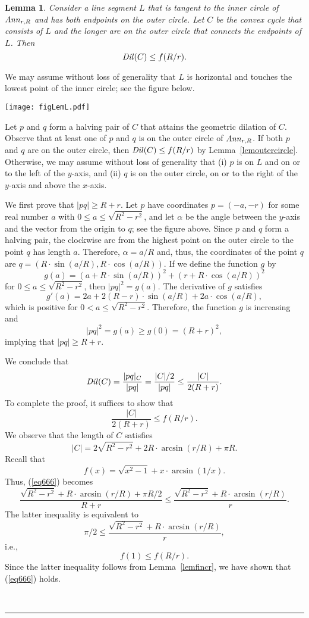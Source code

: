 \documentclass[12pt]{article}
\newtheorem{lemma}{Lemma}
\newcommand{\Ann}{\mathord{\it Ann}}
\newcommand{\Dil}{\mathord{\it Dil}}
\newcommand{\qed}{\rule{0.5em}{1.5ex}}
\newcommand{\fqed}{{\hfill~\qed}}
\newenvironment{proof}{{\noindent \bf Proof.}}
                      {{\hfill \fqed} \vspace{1em}}
\begin{document}
\begin{lemma}   \label{lemthree}  
Consider a line segment $L$ that is tangent to the inner circle of 
$\Ann_{r,R}$ and has both endpoints on the outer circle. Let $C$ be the 
convex cycle that consists of $L$ and the longer arc on the outer circle 
that connects the endpoints of $L$. Then 
\[ \Dil(C) \leq f(R/r) .
\]  
\end{lemma} 
\begin{proof} 
We may assume without loss of generality that $L$ is horizontal and 
touches the lowest point of the inner circle; see the figure below. 

\begin{center}
   \texttt{[image: figLemL.pdf]}
\end{center}

Let $p$ and $q$ form a halving pair of $C$ that attains the geometric 
dilation of $C$. Observe that at least one of $p$ and $q$ is on the 
outer circle of $\Ann_{r,R}$. If both $p$ and $q$ are on the outer 
circle, then $\Dil(C) \leq f(R/r)$ by Lemma~\ref{lemoutercircle}. 
Otherwise, we may assume without loss of generality that 
(i) $p$ is on $L$ and on or to the left of the $y$-axis, and 
(ii) $q$ is on the outer circle, on or to the right of the $y$-axis 
and above the $x$-axis. 

We first prove that $|pq| \geq R+r$. Let $p$ have coordinates $p=(-a,-r)$ 
for some real number $a$ with $0 \leq a \leq \sqrt{R^2-r^2}$, and 
let $\alpha$ be the angle between the $y$-axis and the vector from the 
origin to $q$; see the figure above. Since $p$ and $q$ form a halving 
pair, the clockwise arc from the highest point on the outer circle to 
the point $q$ has length $a$. Therefore, $\alpha = a/R$ and, thus, 
the coordinates of the point $q$ are 
$q = (R \cdot \sin(a/R),R \cdot \cos(a/R))$.   
If we define the function $g$ by 
\[ g(a) = (a+R \cdot \sin(a/R))^2 + (r+R \cdot \cos(a/R))^2  
\]
for $0 \leq a \leq \sqrt{R^2-r^2}$, then $|pq|^2 = g(a)$. 
The derivative of $g$ satisfies 
\[ g'(a) = 2a + 2(R-r) \cdot \sin(a/R) + 2a \cdot \cos(a/R) , 
\]
which is positive for $0 < a \leq \sqrt{R^2-r^2}$. Therefore, the 
function $g$ is increasing and 
\[ |pq|^2 = g(a) \geq g(0) = (R+r)^2 , 
\]
implying that $|pq| \geq R+r$. 

We conclude that 
\[ \Dil(C) = \frac{|pq|_C}{|pq|} = \frac{|C|/2}{|pq|} \leq 
           \frac{|C|}{2(R+r)} . 
\]  
To complete the proof, it suffices to show that 
\begin{equation}  \label{eq666} 
         \frac{|C|}{2(R+r)} \leq f(R/r) . 
\end{equation}  
We observe that the length of $C$ satisfies 
\[ |C| = 2 \sqrt{R^2-r^2} + 2R \cdot \arcsin (r/R) + \pi R . 
\] 
Recall that 
\[ f(x) = \sqrt{x^2-1} + x \cdot \arcsin(1/x) .   
\]
Thus, (\ref{eq666}) becomes 
\[ \frac{\sqrt{R^2-r^2} + R \cdot \arcsin (r/R) + \pi R/2}{R+r} 
    \leq 
   \frac{\sqrt{R^2-r^2} + R \cdot \arcsin (r/R)}{r} .  
\]
The latter inequality is equivalent to 
\[ \pi/2 \leq \frac{\sqrt{R^2-r^2} + R \cdot \arcsin (r/R)}{r} , 
\] 
i.e., 
\[ f(1) \leq f(R/r) . 
\] 
Since the latter inequality follows from Lemma~\ref{lemfincr}, 
we have shown that (\ref{eq666}) holds. 
\end{proof}  
\end{document}
